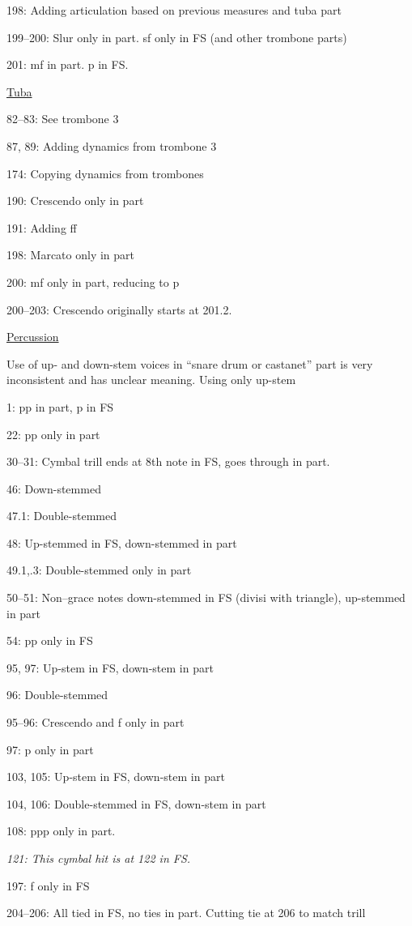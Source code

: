 \documentclass[twoside]{article}
\begin{document}
\begin{hangparas}{15pt}{1}
\begin{multicols}{2}
198: Adding articulation based on previous measures and tuba part

199--200: Slur only in part. sf only in FS (and other trombone parts)

201: mf in part. p in FS.

\underline{Tuba}

82--83: See trombone 3

87, 89: Adding dynamics from trombone 3

174: Copying dynamics from trombones

190: Crescendo only in part

191: Adding ff

198: Marcato only in part

200: mf only in part, reducing to p

200--203: Crescendo originally starts at 201.2.

\underline{Percussion}

Use of up- and down-stem voices in ``snare drum or castanet'' part is very inconsistent and has unclear meaning. Using only up-stem

1: pp in part, p in FS

22: pp only in part

30--31: Cymbal trill ends at 8th note in FS, goes through in part.

46: Down-stemmed

47.1: Double-stemmed

48: Up-stemmed in FS, down-stemmed in part

49.1,.3: Double-stemmed only in part

50--51: Non--grace notes down-stemmed in FS (divisi with triangle), up-stemmed in part

54: pp only in FS

95, 97: Up-stem in FS, down-stem in part

96: Double-stemmed

95--96: Crescendo and f only in part

97: p only in part

103, 105: Up-stem in FS, down-stem in part

104, 106: Double-stemmed in FS, down-stem in part

108: ppp only in part.

\textit{121: This cymbal hit is at 122 in FS.}

197: f only in FS

204--206: All tied in FS, no ties in part. Cutting tie at 206 to match trill


\end{multicols}
\end{hangparas}
\end{document}
